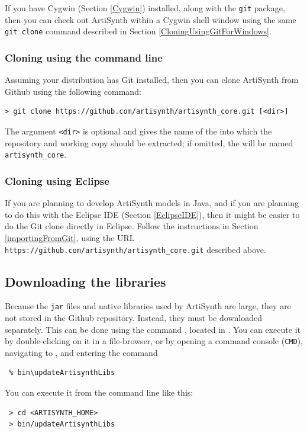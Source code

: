 If you have Cygwin (Section \ref{Cygwin}) installed, along with the
{\tt git} package, then you can check out ArtiSynth within a Cygwin
shell window using the same {\tt git clone} command described
in Section \ref{CloningUsingGitForWindows}.

\else
\subsubsection{Cloning using the command line}

Assuming your \SYSTEM{} distribution has Git installed, then you can
clone ArtiSynth from Github using the following command:
%
\begin{lstlisting}[]
 > git clone https://github.com/artisynth/artisynth_core.git [<dir>]
\end{lstlisting}
%
The argument {\tt <dir>} is optional and gives the name of the
\directory{} into which the repository and working copy should be
extracted; if omitted, the \directory{} will be named {\tt
artisynth\_core}.
\fi

\subsubsection{Cloning using Eclipse}
\label{ArtiSynthEclipseCheckout}

If you are planning to develop ArtiSynth models in Java, and if you
are planning to do this with the Eclipse IDE
(Section \ref{EclipseIDE}), then it might be easier to do the Git
clone directly in Eclipse.  Follow the instructions in
Section \ref{importingFromGit}, using the URL {\tt
https://github.com/artisynth/artisynth\_core.git} described above.

\subsection{Downloading the libraries}
\label{DownloadingLibraries}

Because the {\tt jar} files and native libraries used by ArtiSynth
are large, they are not stored in the Github repository.
Instead, they must be downloaded separately. This can be
done using the command \updateArtisynthLibs, located
in .
\ifWindows
You can execute it by double-clicking on it in a file-browser, or
by opening a command console ({\tt CMD}), navigating
to \ArtHome[], and entering the command
\begin{verbatim}
 % bin\updateArtisynthLibs
\end{verbatim}
\else
You can execute it from the command line like this:
\begin{verbatim}
 > cd <ARTISYNTH_HOME>
 > bin/updateArtisynthLibs
\end{verbatim}
\fi


